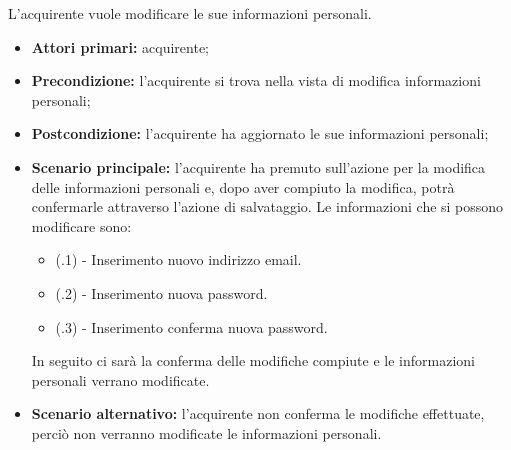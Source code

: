 
L'acquirente vuole modificare le sue informazioni personali.
\begin{itemize}
    \item \textbf{Attori primari:} acquirente;
    \item \textbf{Precondizione:} l'acquirente si trova nella vista di modifica informazioni personali;
    \item \textbf{Postcondizione:} l'acquirente ha aggiornato le sue informazioni personali;
    \item \textbf{Scenario principale:} l'acquirente ha premuto sull'azione per la modifica delle informazioni personali e, dopo aver compiuto la modifica, potrà confermarle attraverso l'azione di salvataggio. Le informazioni che si possono modificare sono:
    \begin{itemize}
        \item (\actualUC.1) - Inserimento nuovo indirizzo email.
        \item (\actualUC.2) - Inserimento nuova password.
        \item (\actualUC.3) - Inserimento conferma nuova password.
    \end{itemize}
    In seguito ci sarà la conferma delle modifiche compiute e le informazioni personali verrano modificate.
    \item \textbf{Scenario alternativo:} l'acquirente non conferma le modifiche effettuate, perciò non verranno modificate le informazioni personali.
\end{itemize}
\resetSubUC

